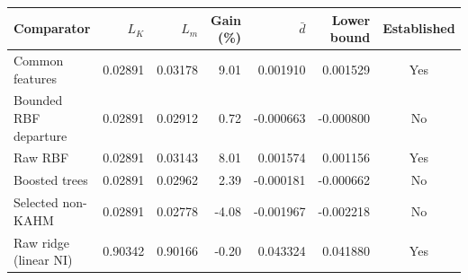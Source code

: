 \begin{tabular}{@{}lrrrrrc@{}}
\toprule
Comparator & $L_K$ & $L_m$ & Gain (\%) & $\bar d$ & Lower bound & Established \\
\midrule
Common features & 0.02891 & 0.03178 & 9.01 & 0.001910 & 0.001529 & Yes \\
Bounded RBF departure & 0.02891 & 0.02912 & 0.72 & -0.000663 & -0.000800 & No \\
Raw RBF & 0.02891 & 0.03143 & 8.01 & 0.001574 & 0.001156 & Yes \\
Boosted trees & 0.02891 & 0.02962 & 2.39 & -0.000181 & -0.000662 & No \\
Selected non-KAHM & 0.02891 & 0.02778 & -4.08 & -0.001967 & -0.002218 & No \\
Raw ridge (linear NI) & 0.90342 & 0.90166 & -0.20 & 0.043324 & 0.041880 & Yes \\
\bottomrule
\end{tabular}

